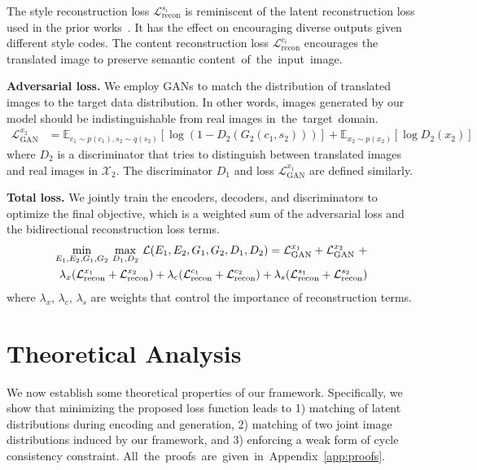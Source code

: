 \documentclass[runningheads]{llncs}
\newcommand{\vpara}[1]{\vspace{0.05in}\noindent\textbf{#1}}
\begin{document}
	The style reconstruction loss $\mathcal{L}^{s_{i}}_{\text{recon}}$ is reminiscent of the latent reconstruction loss used in the prior works~\cite{zhu2017toward,huang2017sgan,srivastava2017veegan,chen2016infogan}. It has the effect on encouraging diverse outputs given different style codes. The content reconstruction loss $\mathcal{L}^{c_{i}}_{\text{recon}}$ encourages the translated image to preserve semantic \mbox{content of the input image.}

	\vpara{Adversarial loss.} We employ GANs to match the distribution of translated images to the target data distribution. In other words, images generated by our model should be indistinguishable from real images \mbox{in the target domain.}
	\begin{align}
	\mathcal{L}^{x_{2}}_{\text{GAN}}&=\mathbb{E}_{c_{1}\sim p(c_{1}), s_{2}\sim q(s_{2})}[\log(1-D_{2}(G_{2}(c_{1},s_{2})))] + \mathbb{E}_{x_{2}\sim p(x_{2})}[\log D_{2}(x_{2})] 
	\end{align}
	where $D_{2}$ is a discriminator that tries to distinguish between translated images and real images in $\mathcal{X}_{2}$. The discriminator $D_{1}$ and loss $\mathcal{L}^{x_{1}}_{\text{GAN}}$ are defined similarly.
	
	\vpara{Total loss.} We jointly train the encoders, decoders, and discriminators to optimize the final objective, which is a weighted sum of the adversarial loss and the bidirectional reconstruction loss terms.
	\begin{align} \underset{E_{1}, E_{2}, G_{1}, G_{2}}\min\ \underset{D_{1}, D_{2}}\max\ \mathcal{L}(E_{1}, E_{2}, G_{1}, G_{2}, D_{1}, D_{2}) = \mathcal{L}^{x_{1}}_{\text{GAN}} + \mathcal{L}^{x_{2}}_{\text{GAN}}\ + \notag \\ 
	\lambda_{x}(\mathcal{L}^{x_{1}}_{\text{recon}}+\mathcal{L}^{x_{2}}_{\text{recon}})+\lambda_{c}(\mathcal{L}^{c_{1}}_{\text{recon}}+\mathcal{L}^{c_{2}}_{\text{recon}})+\lambda_{s}(\mathcal{L}^{s_{1}}_{\text{recon}}+\mathcal{L}^{s_{2}}_{\text{recon}})
	\label{equ:loss}
	\end{align}
	where $\lambda_{x}$, $\lambda_{c}$, $\lambda_{s}$ are weights that control the importance of reconstruction terms.
	
	\section{Theoretical Analysis}
	\label{sec:theory}
	We now establish some theoretical properties of our framework. Specifically, we show that minimizing the proposed loss function leads to 1) matching of latent distributions during encoding and generation, 2) matching of two joint image distributions induced by our framework, and 3) enforcing a weak form of cycle consistency constraint. \mbox{All the proofs are given in Appendix~\ref{app:proofs}.}
	
\end{document}
